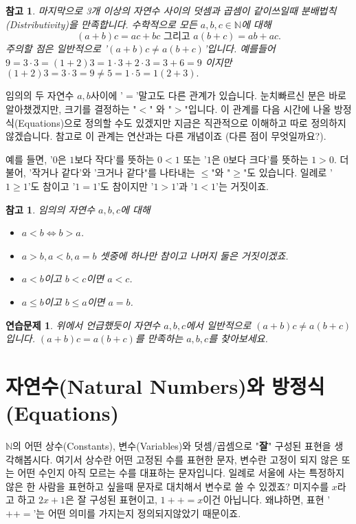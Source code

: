 \documentclass[a4paper, 11pt]{report}
\renewcommand{\<}{\langle}
\renewcommand{\>}{\rangle}
\newtheorem{remark}[thm]{참고}
\newtheorem{exercise}[thm]{연습문제}
\begin{document}
\begin{remark}
  마지막으로 3개 이상의 자연수 사이의 덧셈과 곱셈이 같이쓰일때 분배법칙(Distributivity)을 만족합니다.
  수학적으로 모든 $a, b, c \in \mathbb{N}$에 대해 
  $$
  (a+b)c = ac+bc \text{ 그리고 } a(b+c) = ab + ac.
  $$
  주의할 점은 일반적으로 '$(a+b)c \neq a(b+c)$'입니다. 예를들어
  $9 = 3\cdot 3 = (1+2)3 = 1\cdot 3 + 2\cdot 3 = 3 + 6 = 9$
  이지만 $(1+2)3 = 3\cdot 3 = 9 \neq 5 = 1\cdot 5= 1(2+3).$
\end{remark}

임의의 두 자연수 $a, b$사이에 '$=$'말고도 다른 관계가 있습니다.
눈치빠르신 분은 바로 알아챘겠지만, 크기를 결정하는 "$<$" 와 "$>$"입니다. 이 관계를 다음 시간에 나올 
방정식(Equations)으로 정의할 수도 있겠지만 지금은 직관적으로 이해하고 따로 정의하지 않겠습니다. 참고로
이 관계는 연산과는 다른 개념이죠 (다른 점이 무엇일까요?).

예를 들면, '$0$은 $1$보다 작다'를 뜻하는 $0 < 1$ 또는 '$1$은 $0$보다 크다'를 뜻하는 
$1 > 0$. 더불어, '작거나 같다'와 '크거나 같다"를 나타내는 $\le$"와 "$\ge$"도 있습니다. 
일례로 '$1 \ge 1$'도 참이고 '$1 = 1$'도 참이지만 '$1 > 1$'과 '$1 < 1$'는 거짓이죠.

\begin{remark}
  임의의 자연수 $a, b, c$에 대해 
  \begin{itemize}
    \item $a < b \iff b > a$.
    \item $a > b, a < b, a = b$ 셋중에 하나만 참이고 나머지 둘은 거짓이겠죠.
    \item $a < b$이고 $b < c$이면 $a < c$.
    \item $a \le b$이고 $b \le a$이면 $a = b$.
  \end{itemize}
\end{remark}

\begin{exercise}
  위에서 언급했듯이 자연수 $a, b, c$에서 일반적으로 $(a+b)c \neq a(b+c)$입니다. $(a+b)c = a(b+c)$를 
  만족하는 $a, b, c$를 찾아보세요. 
\end{exercise}

\section{자연수(Natural Numbers)와 방정식(Equations)}

$\mathbb{N}$의 어떤 상수(Constants), 변수(Variables)와 덧셈/곱셈으로 
"\textbf{잘}" 구성된 표현을 생각해봅시다. 여기서 상수란 어떤 고정된 수를 표현한 문자, 변수란 
고정이 되지 않은 또는 어떤 수인지 아직 모르는 수를 대표하는 문자입니다. 일례로 서울에 사는 특정하지 
않은 한 사람을 표현하고 싶을때 문자로 대치해서 변수로 쓸 수 있겠죠? 
미지수를 $x$라고 하고 $2x + 1$은 잘 구성된 표현이고, $1++=x$이건 아닙니다. 
왜냐하면, 표현 '$++=$'는 어떤 의미를 가지는지 정의되지않았기 때문이죠.
\end{document}
